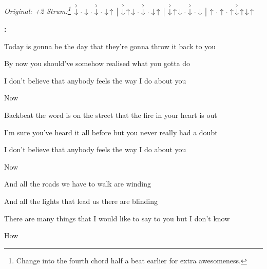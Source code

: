\begin{song}


\begin{headerbox}
\RaiseBoxWithAccents
\textit{Original: +2} \quad
\textit{Strum:\footnote{Change into the fourth chord half a beat earlier for extra awesomeness.}}
$\AccentDown\Miss\Down\Miss\AccentDown\Miss\Down\Up \Separator
\AccentDown\Up\Down\Miss\AccentDown\Miss\Down\Up \Separator
\AccentDown\Up\Down\Miss\AccentDown\Miss\Down \Separator \Up 
\Miss\Up\Miss\Up\AccentDown\Up\Down\Up$ 
\end{headerbox}

\begin{hchordbox}
\end{hchordbox}

\bigskip

\Intro\textbf{:}      \par

\bigskip

 Today is gonna be the day that they're gonna throw it back to you \par
{} By now you should've somehow realised what you gotta do  \par
{}I don't believe that anybody feels the way I do about you \par
{}Now   \par

\bigskip

 Backbeat the word is on the street that the fire in your heart is out \par
{} I'm sure you've heard it all before but you never really had a doubt \par
{}I don't believe that anybody feels the way I do about you \par
{}Now    \par

\bigskip

And all the roads we have to walk are winding \par
And all the lights that lead us there are blinding \par
{}There are many things that I would like to say to you but I don't know \par
{}How \par


\end{song}
